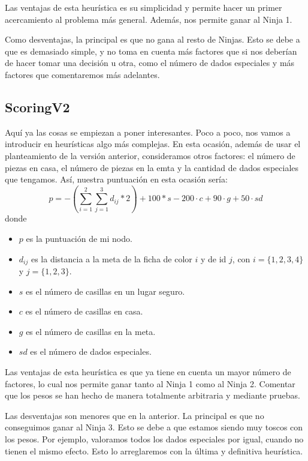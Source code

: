 \documentclass[10pt,a4paper]{article}
\begin{document}
Las ventajas de esta heurística es su simplicidad y permite hacer un primer acercamiento al problema más general. Además, nos permite ganar al Ninja 1.

Como desventajas, la principal es que no gana al resto de Ninjas. Esto se debe a que es demasiado simple, y no toma en cuenta más factores que si nos deberían de hacer tomar una decisión u otra, como el número de dados especiales y más factores que comentaremos más adelantes.

\subsection{ScoringV2}
Aquí ya las cosas se empiezan a poner interesantes. Poco a poco, nos vamos a introducir en heurísticas algo más complejas. En esta ocasión, además de usar el planteamiento de la versión anterior, consideramos otros factores: el número de piezas en casa, el número de piezas en la emta y la cantidad de dados especiales que tengamos. Así, nuestra puntuación en esta ocasión sería:
\[
	p = - \left(\sum_{i = 1}^2 \sum_{j=1}^{3} d_{ij} * 2 \right) + 100 * s  - 200 \cdot c + 90 \cdot g + 50 \cdot sd
\]
donde
\begin{itemize}
	\item \(p\) es la puntuación de mi nodo.
	\item \(d_{ij}\) es la distancia a la meta de la ficha de color \(i\) y de id \(j\), con \(i = \{1,2,3,4\}\) y \(j = \{1,2,3\}\).
	\item \(s\) es el número de casillas en un lugar seguro.
	\item \(c\) es el número de casillas en casa.
	\item \(g\) es el número de casillas en la meta.
	\item \(sd\) es el número de dados especiales.
\end{itemize}

Las ventajas de esta heurística es que ya tiene en cuenta un mayor número de factores, lo cual nos permite ganar tanto al Ninja 1 como al Ninja 2. Comentar que los pesos se han hecho de manera totalmente arbitraria y mediante pruebas.

Las desventajas son menores que en la anterior. La principal es que no conseguimos ganar al Ninja 3. Esto se debe a que estamos siendo muy toscos con los pesos. Por ejemplo, valoramos todos los dados especiales por igual, cuando no tienen el mismo efecto. Esto lo arreglaremos con la última y definitiva heurística.
\end{document}
